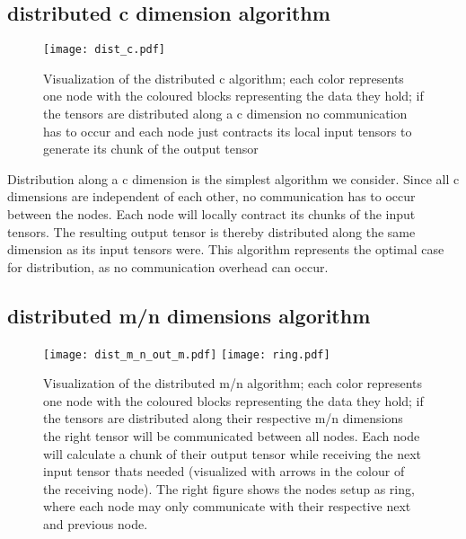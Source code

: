 \subsection{distributed c dimension algorithm}

\begin{figure}[h]
\centering\texttt{[image: dist\_c.pdf]}
\caption{Visualization of the distributed c algorithm; 
each color represents one node with the coloured blocks representing the data they hold; 
if the tensors are distributed along a c dimension no communication has to occur and each node just contracts its local input tensors to generate its chunk of the output tensor}
\label{fig:c_algo}
\end{figure}

Distribution along a c dimension is the simplest algorithm we consider. 
Since all c dimensions are independent of each other, no communication has to occur between the nodes.
Each node will locally contract its chunks of the input tensors.
The resulting output tensor is thereby distributed along the same dimension as its input tensors were.
This algorithm represents the optimal case for distribution, as no communication overhead can occur.

\subsection{distributed m/n dimensions algorithm}

\begin{figure}[h]
\texttt{[image: dist\_m\_n\_out\_m.pdf]}
\texttt{[image: ring.pdf]}
\caption{Visualization of the distributed m/n algorithm; 
each color represents one node with the coloured blocks representing the data they hold; 
if the tensors are distributed along their respective m/n dimensions the right tensor will be communicated between all nodes. 
Each node will calculate a chunk of their output tensor while receiving the next input tensor thats needed (visualized with arrows in the colour of the receiving node). 
The right figure shows the nodes setup as ring, where each node may only communicate with their respective next and previous node.}
\label{fig:m_n_algo}
\end{figure}

